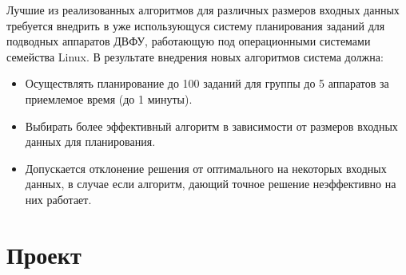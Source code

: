 \documentclass[a4paper,14pt,russian]{article}
\begin{document}
Лучшие из реализованных алгоритмов для различных размеров входных данных требуется внедрить в уже использующуся систему планирования заданий для подводных аппаратов ДВФУ, работающую под операционными системами семейства Linux. В результате внедрения новых алгоритмов система должна:
\begin{itemize}

\item Осуществлять планирование до 100 заданий для группы до 5 аппаратов за приемлемое время (до 1 минуты).
\item Выбирать более эффективный алгоритм в зависимости от размеров входных данных для планирования.
\item Допускается отклонение решения от оптимального на некоторых входных данных, в случае если алгоритм, дающий точное решение неэффективно на них работает.
\end{itemize}


\section{Проект}
\end{document}
